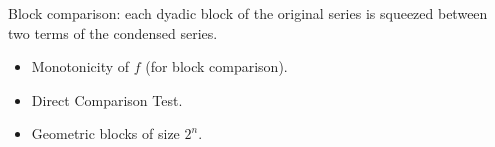 \begin{remark*}
Block comparison: each dyadic block of the original series is squeezed between two terms of the condensed series.
\end{remark*}

\begin{remark*}[Dependencies]
\begin{itemize}
  \item Monotonicity of $f$ (for block comparison).
  \item Direct Comparison Test.
  \item Geometric blocks of size $2^n$.
\end{itemize}
\end{remark*}
